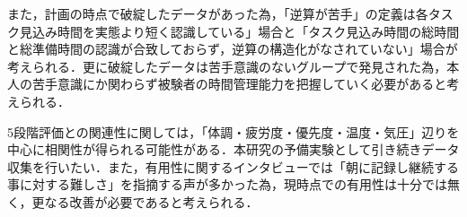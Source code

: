 また，計画の時点で破綻したデータがあった為，「逆算が苦手」の定義は各タスク見込み時間を実態より短く認識している」場合と「タスク見込み時間の総時間と総準備時間の認識が合致しておらず，逆算の構造化がなされていない」場合が考えられる．更に破綻したデータは苦手意識のないグループで発見された為，本人の苦手意識にか関わらず被験者の時間管理能力を把握していく必要があると考えられる．

5段階評価との関連性に関しては，「体調・疲労度・優先度・温度・気圧」辺りを中心に相関性が得られる可能性がある．本研究の予備実験として引き続きデータ収集を行いたい．また，有用性に関するインタビューでは「朝に記録し継続する事に対する難しさ」を指摘する声が多かった為，現時点での有用性は十分では無く，更なる改善が必要であると考えられる．